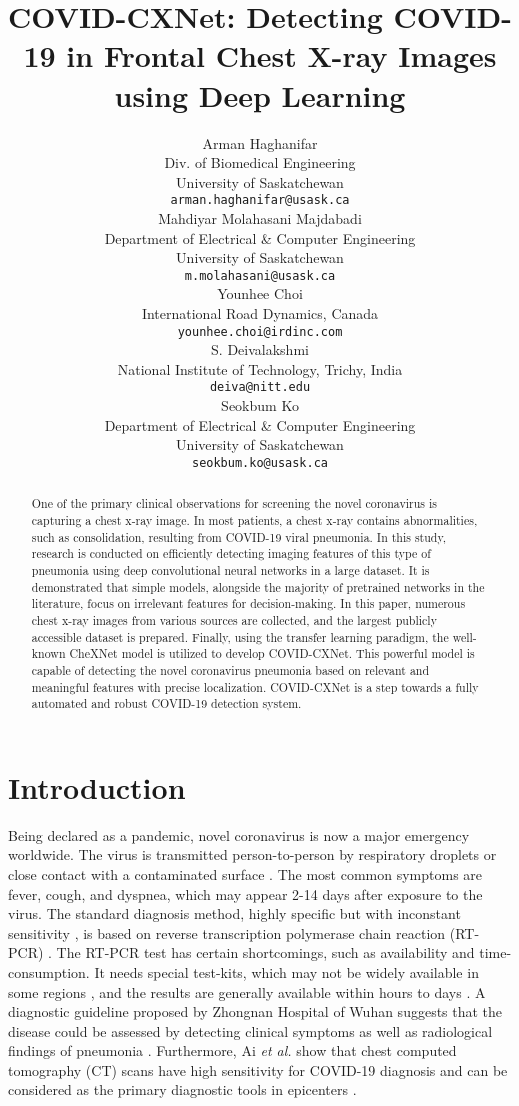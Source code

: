 \documentclass{article}
\title{COVID-CXNet: Detecting COVID-19 in Frontal Chest X-ray Images using Deep Learning}
\author{
  Arman Haghanifar\\
  Div. of Biomedical Engineering\\
  University of Saskatchewan\\
  \texttt{arman.haghanifar@usask.ca}\\
   \And
  Mahdiyar Molahasani Majdabadi \\
  Department of Electrical \& Computer Engineering\\
  University of Saskatchewan\\
  \texttt{m.molahasani@usask.ca}\\
   \And
  Younhee Choi \\
  International Road Dynamics, Canada\\
  \texttt{younhee.choi@irdinc.com}\\
   \And
  S. Deivalakshmi \\
  National Institute of Technology, Trichy, India\\
  \texttt{deiva@nitt.edu}\\
   \And
  Seokbum Ko \\
  Department of Electrical \& Computer Engineering\\
  University of Saskatchewan\\
  \texttt{seokbum.ko@usask.ca}\\
}
\begin{document}
\maketitle


\begin{abstract}
One of the primary clinical observations for screening the novel coronavirus is capturing a chest x-ray image. In most patients, a chest x-ray contains abnormalities, such as consolidation, resulting from COVID-19 viral pneumonia. In this study, research is conducted on efficiently detecting imaging features of this type of pneumonia using deep convolutional neural networks in a large dataset. It is demonstrated that simple models, alongside the majority of pretrained networks in the literature, focus on irrelevant features for decision-making. In this paper, numerous chest x-ray images from various sources are collected, and the largest publicly accessible dataset is prepared. Finally, using the transfer learning paradigm, the well-known CheXNet model is utilized to develop COVID-CXNet. This powerful model is capable of detecting the novel coronavirus pneumonia based on relevant and meaningful features with precise localization. COVID-CXNet is a step towards a fully automated and robust COVID-19 detection system.
\end{abstract}



\section{Introduction}
Being declared as a pandemic, novel coronavirus is now a major emergency worldwide. The virus is transmitted person-to-person by respiratory droplets or close contact with a contaminated surface \cite{world2020coronavirus}. The most common symptoms are fever, cough, and dyspnea, which may appear 2-14 days after exposure to the virus. The standard diagnosis method, highly specific but with inconstant sensitivity \cite{kanne2020essentials}, is based on reverse transcription polymerase chain reaction (RT-PCR) \cite{rio2014reverse}. The RT-PCR test has certain shortcomings, such as availability and time-consumption. It needs special test-kits, which may not be widely available in some regions \cite{bai2020performance}, and the results are generally available within hours to days \cite{brueck2020coronavirus}. A diagnostic guideline proposed by Zhongnan Hospital of Wuhan suggests that the disease could be assessed by detecting clinical symptoms as well as radiological findings of pneumonia \cite{jin2020rapid}. Furthermore, Ai \textit{et al.} show that chest computed tomography (CT) scans have high sensitivity for COVID-19 diagnosis and can be considered as the primary diagnostic tools in epicenters \cite{ai2020correlation}.
\end{document}

